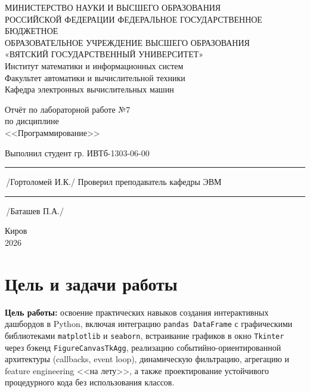 \documentclass[oneside,a4paper,14pt]{extarticle} %
\begin{document}
	\newpage\thispagestyle{empty}
	\begin{center}
		МИНИСТЕРСТВО НАУКИ И ВЫСШЕГО ОБРАЗОВАНИЯ\\
			РОССИЙСКОЙ ФЕДЕРАЦИИ
			ФЕДЕРАЛЬНОЕ ГОСУДАРСТВЕННОЕ БЮДЖЕТНОЕ\\
			ОБРАЗОВАТЕЛЬНОЕ
			УЧРЕЖДЕНИЕ ВЫСШЕГО ОБРАЗОВАНИЯ\\
			«ВЯТСКИЙ ГОСУДАРСТВЕННЫЙ УНИВЕРСИТЕТ»\\
			Институт математики и информационных систем\\
			Факультет автоматики и вычислительной техники\\
			Кафедра электронных вычислительных машин
	\end{center}
	\vspace{20mm}

	\begin{center}
		Отчёт по лабораторной работе №7\\
		по дисциплине\\
		<<Программирование>>\\
	\end{center}
	\vspace{48mm}

	\noindent
	Выполнил студент гр. ИВТб-1303-06-00 \hfill \rule[-0,5mm]{30mm}{0.15mm}\,/Гортоломей И.К./
	\newline
	Проверил преподаватель кафедры ЭВМ \hfill \rule[-0,5mm]{30mm}{0.15mm}\,/Баташев П.А./

	\vfill
	\begin{center}
		Киров\\
		2026
	\end{center}

	\newpage
	\thispagestyle{empty}

\section{Цель и задачи работы}
\textbf{Цель работы:} освоение практических навыков создания интерактивных дашбордов в Python, включая интеграцию \texttt{pandas DataFrame} с графическими библиотеками \texttt{matplotlib} и \texttt{seaborn}, встраивание графиков в окно \texttt{Tkinter} через бэкенд \texttt{FigureCanvasTkAgg}, реализацию событийно-ориентированной архитектуры (callbacks, event loop), динамическую фильтрацию, агрегацию и feature engineering <<на лету>>, а также проектирование устойчивого процедурного кода без использования классов.
\end{document}
